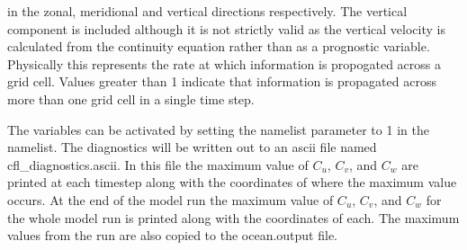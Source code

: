 \documentclass[../tex_main/NEMO_manual]{subfiles}
\begin{document}
in the zonal, meridional and vertical directions respectively.
The vertical component is included although it is not strictly valid as the vertical velocity is 
calculated from the continuity equation rather than as a prognostic variable.
Physically this represents the rate at which information is propogated across a grid cell.
Values greater than 1 indicate that information is propagated across more than one grid cell in 
a single time step.

The variables can be activated by setting the  namelist parameter to 1 in 
the  namelist.
The diagnostics will be written out to an ascii file named cfl\_diagnostics.ascii.
In this file the maximum value of $C_u$, $C_v$, and $C_w$ are printed at each timestep along with 
the coordinates of where the maximum value occurs.
At the end of the model run the maximum value of $C_u$, $C_v$, and $C_w$ for the whole model run is 
printed along with the coordinates of each.
The maximum values from the run are also copied to the ocean.output file. 

\end{document}
